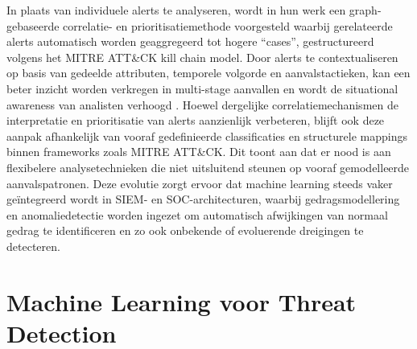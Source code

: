 \newline
\newline
In plaats van individuele alerts te analyseren, wordt in hun werk een graph-gebaseerde correlatie- en prioritisatiemethode voorgesteld waarbij gerelateerde alerts automatisch worden geaggregeerd tot hogere “cases”, gestructureerd volgens het MITRE ATT\&CK kill chain model. Door alerts te contextualiseren op basis van gedeelde attributen, temporele volgorde en aanvalstactieken, kan een beter inzicht worden verkregen in multi-stage aanvallen en wordt de situational awareness van analisten verhoogd \autocite{Garcia2025ROSCA}.
\newline
\newline
Hoewel dergelijke correlatiemechanismen de interpretatie en prioritisatie van alerts aanzienlijk verbeteren, blijft ook deze aanpak afhankelijk van vooraf gedefinieerde classificaties en structurele mappings binnen frameworks zoals MITRE ATT\&CK. Dit toont aan dat er nood is aan flexibelere analysetechnieken die niet uitsluitend steunen op vooraf gemodelleerde aanvalspatronen.
\newline
\newline
Deze evolutie zorgt ervoor dat machine learning steeds vaker geïntegreerd wordt in SIEM- en SOC-architecturen, waarbij gedragsmodellering en anomaliedetectie worden ingezet om automatisch afwijkingen van normaal gedrag te identificeren en zo ook onbekende of evoluerende dreigingen te detecteren.


\section{Machine Learning voor Threat Detection}

